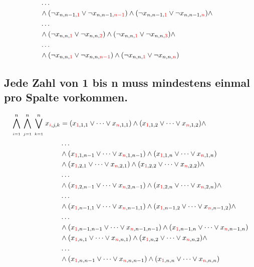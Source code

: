 \documentclass[11pt, a4paper]{article}
\begin{document}
\begin{align*}
		\\ & \dots \\
		& \wedge (\neg x_{n,n-1,{\color{red} 1}} \vee \neg x_{n,n-1,{\color{red} n-1}}) \wedge (\neg x_{n,n-1,{\color{red} 1}} \vee \neg x_{n,n-1,{\color{red} n}}) \wedge
		\\ & \dots \\
		& \wedge (\neg x_{n,n,{\color{red} 1}} \vee \neg x_{n,n,{\color{red} 2}}) \wedge (\neg x_{n,n,{\color{red} 1}} \vee \neg x_{n,n,{\color{red} 3}}) \wedge 
		\\ & \dots \\
		& \wedge (\neg x_{n,n,{\color{red} 1}} \vee \neg x_{n,n,{\color{red} n-1}}) \wedge (\neg x_{n,n,{\color{red} 1}} \vee \neg x_{n,n,{\color{red} n}})
	\end{align*}
	\bigskip
		
	\subsection{Jede Zahl von 1 bis n muss mindestens einmal pro Spalte vorkommen.}
	\begin{align*}
		\bigwedge_{\atop i=1}^n \bigwedge_{\atop j=1}^n \bigvee_{\atop k=1}^n
		x_{{\color{red} i},j,k} &= (x_{{\color{red}1},1,1} \vee \dots \vee x_{{\color{red} n},1,1}) \wedge (x_{{\color{red} 1},1,2} \vee \dots \vee x_{{\color{red} n},1,2}) \wedge 
		\\ & \dots \\
		& \wedge (x_{{\color{red}1},1,n-1} \vee \dots \vee x_{{\color{red} n},1,n-1}) \wedge (x_{{\color{red} 1},1,n} \vee \dots \vee x_{{\color{red} n},1,n}) \\
		& \wedge (x_{{\color{red}1},2,1} \vee \dots \vee x_{{\color{red} n},2,1}) \wedge (x_{{\color{red} 1},2,2} \vee \dots \vee x_{{\color{red} n},2,2}) \wedge 
		\\ & \dots \\
		& \wedge (x_{{\color{red}1},2,n-1} \vee \dots \vee x_{{\color{red} n},2,n-1})
		\wedge (x_{{\color{red} 1},2,n} \vee \dots \vee x_{{\color{red} n},2,n}) \wedge 
		\\ & \dots \\
		& \wedge (x_{{\color{red}1},n-1,1} \vee \dots \vee x_{{\color{red} n},n-1,1})
		\wedge (x_{{\color{red} 1},n-1,2} \vee \dots \vee x_{{\color{red} n},n-1,2}) \wedge 
		\\ & \dots \\
		& \wedge (x_{{\color{red}1},n-1,n-1} \vee \dots \vee x_{{\color{red} n},n-1,n-1}) \wedge (x_{{\color{red} 1},n-1,n} \vee \dots \vee x_{{\color{red} n},n-1,n}) \\
		& \wedge (x_{{\color{red}1},n,1} \vee \dots \vee x_{{\color{red} n},n,1}) \wedge (x_{{\color{red} 1},n,2} \vee \dots \vee x_{{\color{red} n},n,2}) \wedge 
		\\ & \dots \\
		& \wedge (x_{{\color{red}1},n,n-1} \vee \dots \vee x_{{\color{red} n},n,n-1}) \wedge (x_{{\color{red} 1},n,n} \vee \dots \vee x_{{\color{red} n},n,n})
	\end{align*}
	\bigskip
	
\end{document}
